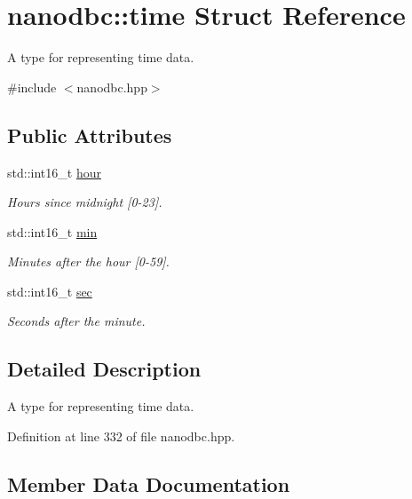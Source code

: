 \hypertarget{structnanodbc_1_1time}{}\section{nanodbc\+::time Struct Reference}
\label{structnanodbc_1_1time}


A type for representing time data.  




{\ttfamily \#include $<$nanodbc.\+hpp$>$}

\subsection*{Public Attributes}
\begin{DoxyCompactItemize}
\item 
std\+::int16\+\_\+t \mbox{\hyperlink{structnanodbc_1_1time_a057fb220c0d675c9760b86666a985dbc}{hour}}
\begin{DoxyCompactList}\small\item\em Hours since midnight \mbox{[}0-\/23\mbox{]}. \end{DoxyCompactList}\item 
std\+::int16\+\_\+t \mbox{\hyperlink{structnanodbc_1_1time_a343d25fdd7c3e67467bf18d3d9cc82c9}{min}}
\begin{DoxyCompactList}\small\item\em Minutes after the hour \mbox{[}0-\/59\mbox{]}. \end{DoxyCompactList}\item 
std\+::int16\+\_\+t \mbox{\hyperlink{structnanodbc_1_1time_a57df2df9fcc00af1e9c34e95899a420b}{sec}}
\begin{DoxyCompactList}\small\item\em Seconds after the minute. \end{DoxyCompactList}\end{DoxyCompactItemize}


\subsection{Detailed Description}
A type for representing time data. 

Definition at line 332 of file nanodbc.\+hpp.



\subsection{Member Data Documentation}
\mbox{\label{structnanodbc_1_1time_a057fb220c0d675c9760b86666a985dbc}} 
